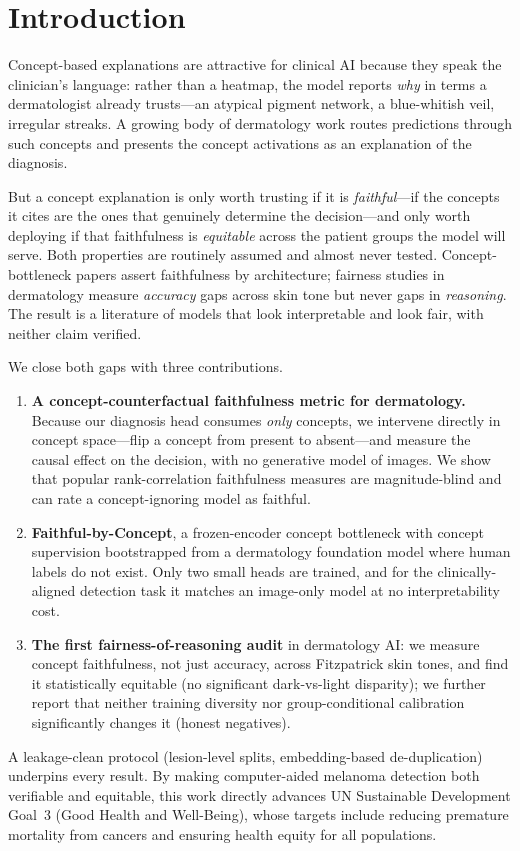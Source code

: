\documentclass{svproc}
\begin{document}
\section{Introduction}

Concept-based explanations are attractive for clinical AI because they speak the
clinician's language: rather than a heatmap, the model reports \emph{why} in terms a
dermatologist already trusts---an atypical pigment network, a blue-whitish veil,
irregular streaks. A growing body of dermatology work routes predictions through such
concepts and presents the concept activations as an explanation of the diagnosis.

But a concept explanation is only worth trusting if it is \emph{faithful}---if the
concepts it cites are the ones that genuinely determine the decision---and only worth
deploying if that faithfulness is \emph{equitable} across the patient groups the model
will serve. Both properties are routinely assumed and almost never tested.
Concept-bottleneck papers assert faithfulness by architecture; fairness studies in
dermatology measure \emph{accuracy} gaps across skin tone but never gaps in
\emph{reasoning}. The result is a literature of models that look interpretable and
look fair, with neither claim verified.

We close both gaps with three contributions.
\begin{enumerate}
\item \textbf{A concept-counterfactual faithfulness metric for dermatology.} Because
our diagnosis head consumes \emph{only} concepts, we intervene directly in concept
space---flip a concept from present to absent---and measure the causal effect on the
decision, with no generative model of images. We show that popular rank-correlation
faithfulness measures are magnitude-blind and can rate a concept-ignoring model as
faithful.
\item \textbf{Faithful-by-Concept}, a frozen-encoder concept bottleneck with concept
supervision bootstrapped from a dermatology foundation model where human labels do not
exist. Only two small heads are trained, and for the clinically-aligned detection task
it matches an image-only model at no interpretability cost.
\item \textbf{The first fairness-of-reasoning audit} in dermatology AI: we measure
concept faithfulness, not just accuracy, across Fitzpatrick skin tones, and find it
statistically equitable (no significant dark-vs-light disparity); we further report
that neither training diversity nor group-conditional calibration significantly changes
it (honest negatives).
\end{enumerate}
A leakage-clean protocol (lesion-level splits, embedding-based de-duplication)
underpins every result. By making computer-aided melanoma detection both verifiable and
equitable, this work directly advances UN Sustainable Development Goal~3 (Good Health and
Well-Being), whose targets include reducing premature mortality from cancers and
ensuring health equity for all populations.
\end{document}
